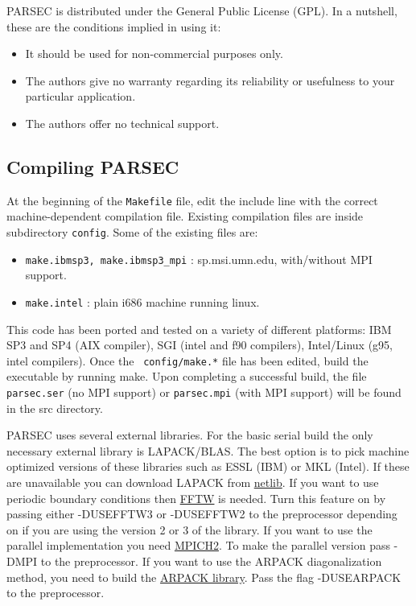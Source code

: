 \documentclass{article}
\begin{document}
PARSEC is distributed under the General Public License (GPL). In a
nutshell, these are the conditions implied in using it:

\begin{itemize}
\item It should be used for non-commercial purposes only.
\item The authors give no warranty regarding its reliability or
  usefulness to your particular application.
\item The authors offer no technical support.
\end{itemize}



\subsection{Compiling PARSEC}

At the beginning of the {\tt Makefile} file, edit the include line with
the correct machine-dependent compilation file. Existing compilation files
are inside subdirectory {\tt config}. Some of the existing files are:

\begin{itemize}
\item {\tt make.ibmsp3, make.ibmsp3\_mpi} : sp.msi.umn.edu, with/without MPI support.
\item {\tt make.intel} : plain i686 machine running linux.
\end{itemize}

This code has been ported and tested on a variety of different 
platforms: IBM SP3 and SP4 (AIX compiler), SGI (intel and f90 
compilers), Intel/Linux (g95, intel compilers).  Once the {\tt 
config/make.*} file has been edited, build the executable by running 
make.  Upon completing a successful build, the file {\tt parsec.ser} (no 
MPI support) or {\tt parsec.mpi} (with MPI support) will be found in the 
src directory.

PARSEC uses several external libraries. For the basic serial build the
only necessary external library is LAPACK/BLAS. The best option is to
pick machine optimized versions of these libraries such as ESSL (IBM)
or MKL (Intel). If these are unavailable you can download LAPACK from
\href{http://www.netlib.org/lapack/}{netlib}. If you want to use
periodic boundary conditions then
\href{http://www.fftw.org/}{FFTW} is needed. Turn this feature on
by passing either -DUSEFFTW3 or -DUSEFFTW2 to the preprocessor
depending on if you are using the version 2 or 3 of the library. If
you want to use the parallel implementation you need
\href{http://www-unix.mcs.anl.gov/mpi/mpich/}{MPICH2}. To make the
parallel version pass -DMPI to the preprocessor. If you want to use
the ARPACK diagonalization method, you need to build the
\href{http://www.caam.rice.edu/software/ARPACK/}{ARPACK library}. Pass the flag
-DUSEARPACK to the preprocessor.
\end{document}
